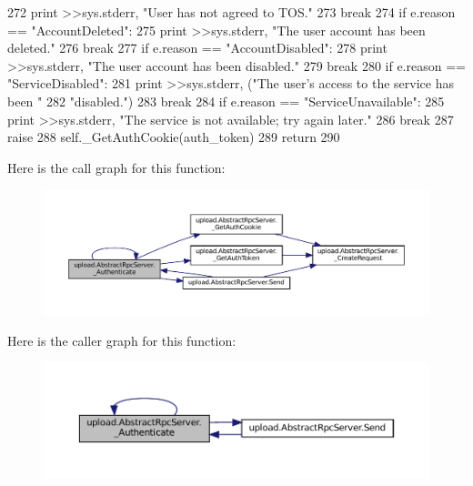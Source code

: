 \begin{DoxyCode}
272           \textcolor{keywordflow}{print} >>sys.stderr, \textcolor{stringliteral}{"User has not agreed to TOS."}
273           \textcolor{keywordflow}{break}
274         \textcolor{keywordflow}{if} e.reason == \textcolor{stringliteral}{"AccountDeleted"}:
275           \textcolor{keywordflow}{print} >>sys.stderr, \textcolor{stringliteral}{"The user account has been deleted."}
276           \textcolor{keywordflow}{break}
277         \textcolor{keywordflow}{if} e.reason == \textcolor{stringliteral}{"AccountDisabled"}:
278           \textcolor{keywordflow}{print} >>sys.stderr, \textcolor{stringliteral}{"The user account has been disabled."}
279           \textcolor{keywordflow}{break}
280         \textcolor{keywordflow}{if} e.reason == \textcolor{stringliteral}{"ServiceDisabled"}:
281           \textcolor{keywordflow}{print} >>sys.stderr, (\textcolor{stringliteral}{"The user's access to the service has been "}
282                                \textcolor{stringliteral}{"disabled."})
283           \textcolor{keywordflow}{break}
284         \textcolor{keywordflow}{if} e.reason == \textcolor{stringliteral}{"ServiceUnavailable"}:
285           \textcolor{keywordflow}{print} >>sys.stderr, \textcolor{stringliteral}{"The service is not available; try again later."}
286           \textcolor{keywordflow}{break}
287         \textcolor{keywordflow}{raise}
288       self.\_GetAuthCookie(auth\_token)
289       \textcolor{keywordflow}{return}
290 
\end{DoxyCode}
Here is the call graph for this function\+:
\nopagebreak
\begin{figure}[H]
\begin{center}
\leavevmode
\includegraphics[width=350pt]{classupload_1_1AbstractRpcServer_a8517a9d90ee2478752a53302f01d868d_cgraph}
\end{center}
\end{figure}
Here is the caller graph for this function\+:
\nopagebreak
\begin{figure}[H]
\begin{center}
\leavevmode
\includegraphics[width=350pt]{classupload_1_1AbstractRpcServer_a8517a9d90ee2478752a53302f01d868d_icgraph}
\end{center}
\end{figure}
